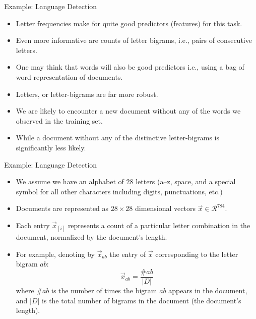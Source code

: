 \documentclass[handout]{beamer}
\begin{document}
\begin{frame}{Example: Language Detection}
\begin{scriptsize}
\begin{itemize}

\item Letter frequencies make for quite good predictors (features) for this task.
\item Even more informative are counts of letter bigrams, i.e., pairs of consecutive letters.
\item One may think that words will also be good predictors i.e., using a bag of word representation of documents.
\item Letters, or letter-bigrams are far more robust.
\item We are likely to encounter a new document without any of the words we observed in the training set.
\item While a document without any of the distinctive letter-bigrams is significantly less likely. \cite{goldberg2017neural}
\end{itemize}


\end{scriptsize}
\end{frame}



\begin{frame}{Example: Language Detection}
\begin{scriptsize}
\begin{itemize}
\item We assume we have an alphabet of 28 letters (a–z, space, and a special symbol for all other characters including digits, punctuations, etc.)
\item Documents are represented as $28\times28$ dimensional vectors $\vec{x} \in \mathcal{R}^{784}$.
\item Each entry $\vec{x}_{[i]}$  represents a count of a particular letter combination in the document, normalized by the document's length.
\item For example, denoting by $\vec{x}_{ab}$ the entry of $\vec{x}$ corresponding to the letter bigram $ab$:
\begin{equation}
 \vec{x}_{ab}= \frac{\#ab}{|D|}
\end{equation}
where $\#ab$ is the number of times the bigram $ab$ appears in the document, and $|D|$ is the total number of bigrams in the document (the document’s length).


\end{itemize}


\end{scriptsize}
\end{frame}
\end{document}
